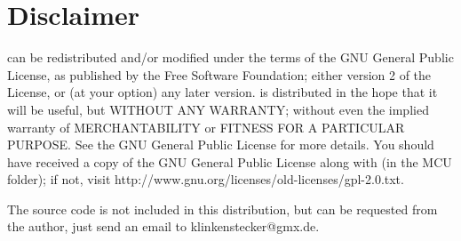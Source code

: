 \section{Disclaimer}\label{disclaimer}

\mcu can be redistributed and/or modified under the terms of the GNU
General Public License, as published by the Free Software Foundation; either
version 2 of the License, or (at your option) any later version.
\mcu is distributed in the hope that it will be useful, but WITHOUT
ANY WARRANTY; without even the implied warranty of MERCHANTABILITY or FITNESS
FOR A PARTICULAR PURPOSE. See the GNU General Public License for more details.
You should have received a copy of the GNU General Public License along with
\mcu (in the MCU folder); if not, visit
http://www.gnu.org/licenses/old-licenses/gpl-2.0.txt.

The source code is not included in this distribution, but can be requested from
the author, just send an email to klinkenstecker@gmx.de.
